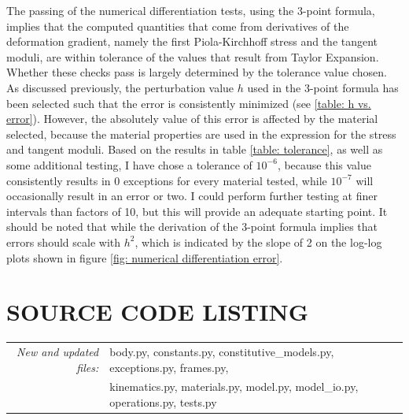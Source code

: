 \documentclass[]{spie}  %
\begin{document}
The passing of the numerical differentiation tests, using the 3-point formula, implies that the computed quantities that come from derivatives of the deformation gradient, namely the first Piola-Kirchhoff stress and the tangent moduli, are within tolerance of the values that result from Taylor Expansion. Whether these checks pass is largely determined by the tolerance value chosen. As discussed previously, the perturbation value $h$ used in the 3-point formula has been selected such that the error is consistently minimized (see \ref{table: h vs. error}). However, the absolutely value of this error is affected by the material selected, because the material properties are used in the expression for the stress and tangent moduli. Based on the results in table \ref{table: tolerance}, as well as some additional testing, I have chose a tolerance of $10^{-6}$, because this value consistently results in 0 exceptions for every material tested, while $10^{-7}$ will occasionally result in an error or two. I could perform further testing at finer intervals than factors of 10, but this will provide an adequate starting point. It should be noted that while the derivation of the 3-point formula implies that errors should scale with $h^2$, which is indicated by the slope of 2 on the log-log plots shown in figure \ref{fig: numerical differentiation error}. 


\section{SOURCE CODE LISTING}

\begin{tabular}{ r l }
\textit{New and updated files:} & body.py, constants.py, constitutive\_models.py, exceptions.py, frames.py, \\
					  & kinematics.py, materials.py, model.py, model\_io.py, operations.py, tests.py 
\end{tabular}
\end{document}
